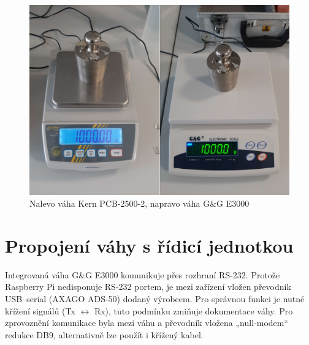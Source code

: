 \begin{figure}[H]
    \begin{center}
        \includegraphics[scale=0.1]{obrazky/vahy.jpg}
    \end{center}
    \caption{Nalevo váha Kern PCB-2500-2, napravo váha G\&G E3000}
    \label{obr:váhy_porovnani}
\end{figure}

\section{Propojení váhy s řídicí jednotkou}

Integrovaná váha G\&G E3000 komunikuje přes rozhraní RS-232. Protože Raspberry Pi nedisponuje RS-232 portem, je mezi zařízení vložen převodník USB–serial (AXAGO ADS-50) dodaný výrobcem. Pro správnou funkci je nutné křížení signálů (Tx $\leftrightarrow$ Rx), tuto podmínku zmiňuje dokumentace váhy. Pro zprovoznění komunikace byla mezi váhu a převodník vložena „null-modem“ redukce DB9, alternativně lze použít i křížený kabel.






